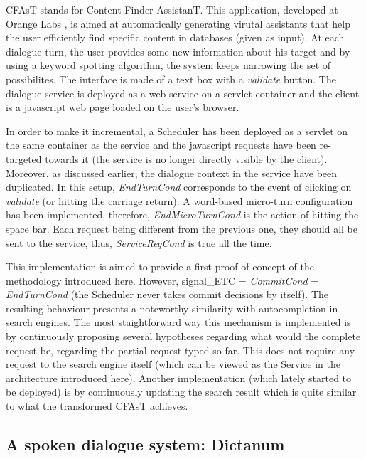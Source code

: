         CFAsT stands for Content Finder AssistanT. This application, developed at Orange Labs \cite{Laroche2014,Laroche2015}, is aimed at automatically generating virutal assistants that help the user efficiently find specific content in databases (given as input). At each dialogue turn, the user provides some new information about his target and by using a keyword spotting algorithm, the system keeps narrowing the set of possibilites. The interface is made of a text box with a \textit{validate} button. The dialogue service is deployed as a web service on a servlet container and the client is a javascript web page loaded on the user's browser.
        
        In order to make it incremental, a Scheduler has been deployed as a servlet on the same container as the service and the javascript requests have been re-targeted towards it (the service is no longer directly visible by the client). Moreover, as discussed earlier, the dialogue context in the service have been duplicated. In this setup, \textit{EndTurnCond} corresponds to the event of clicking on \textit{validate} (or hitting the carriage return). A word-based micro-turn configuration has been implemented, therefore, \textit{EndMicroTurnCond} is the action of hitting the space bar. Each request being different from the previous one, they should all be sent to the service, thus, \textit{ServiceReqCond} is true all the time.
        
        This implementation is aimed to provide a first proof of concept of the methodology introduced here. However, signal\_ETC = \textit{CommitCond} = \textit{EndTurnCond} (the Scheduler never takes commit decisions by itself). The resulting behaviour presents a noteworthy similarity with autocompletion in search engines. The most staightforward way this mechanism is implemented is by continuously proposing several hypotheses regarding what would the complete request be, regarding the partial request typed so far. This does not require any request to the search engine itself (which can be viewed as the Service in the architecture introduced here). Another implementation (which lately started to be deployed) is by continuously updating the search result which is quite similar to what the transformed CFAsT achieves.
    
    \subsection{A spoken dialogue system: Dictanum}
    
